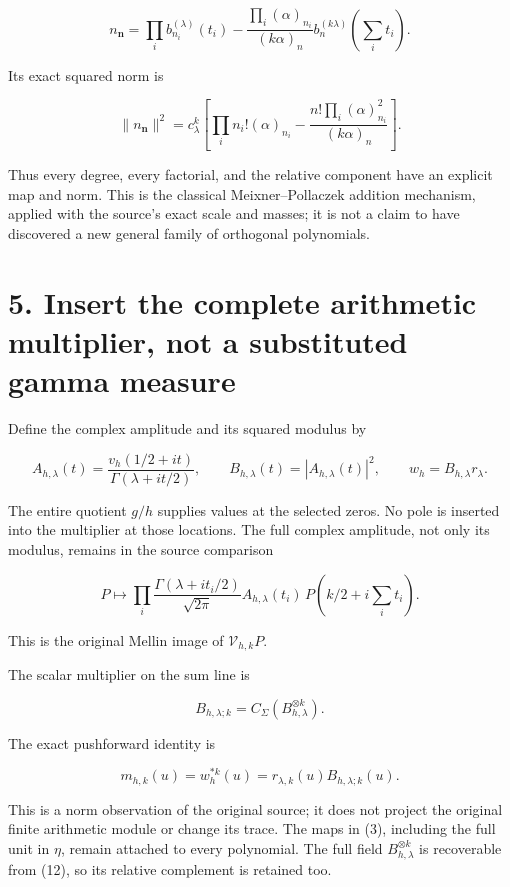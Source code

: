 \documentclass[
  11pt,
]{article}
\begin{document}
\[
n_{\mathbf n}=\prod_i b_{n_i}^{(\lambda)}(t_i)
 -\frac{\prod_i(\alpha)_{n_i}}{(k\alpha)_n}
                    b_n^{(k\lambda)}(\sum_i t_i).
\]

Its exact squared norm is

\[
\boxed{
\|n_{\mathbf n}\|^2
=c_\lambda^k\left[
\prod_i n_i!(\alpha)_{n_i}
 -\frac{n!\prod_i(\alpha)_{n_i}^2}{(k\alpha)_n}
\right].
}                                                                   \tag{16}
\]

Thus every degree, every factorial, and the relative component have an
explicit map and norm. This is the classical Meixner--Pollaczek addition
mechanism, applied with the source's exact scale and masses; it is not a
claim to have discovered a new general family of orthogonal polynomials.

\section{5. Insert the complete arithmetic multiplier, not a substituted
gamma
measure}\label{insert-the-complete-arithmetic-multiplier-not-a-substituted-gamma-measure}

Define the complex amplitude and its squared modulus by

\[
A_{h,\lambda}(t)
=\frac{v_h(1/2+it)}{\Gamma(\lambda+it/2)},\qquad
B_{h,\lambda}(t)=|A_{h,\lambda}(t)|^2,
\qquad w_h=B_{h,\lambda}r_\lambda.                                 \tag{17}
\]

The entire quotient \(g/h\) supplies values at the selected zeros. No
pole is inserted into the multiplier at those locations. The full
complex amplitude, not only its modulus, remains in the source
comparison

\[
P\longmapsto
\prod_i\frac{\Gamma(\lambda+it_i/2)}{\sqrt{2\pi}}
 A_{h,\lambda}(t_i)\,P(k/2+i\sum_i t_i).
                                                                    \tag{18}
\]

This is the original Mellin image of \(\mathcal V_{h,k}P\).

The scalar multiplier on the sum line is

\[
B_{h,\lambda;k}=C_\Sigma(B_{h,\lambda}^{\otimes k}).
\]

The exact pushforward identity is

\[
\boxed{
 m_{h,k}(u)=w_h^{*k}(u)=r_{\lambda,k}(u)B_{h,\lambda;k}(u).
}                                                                   \tag{19}
\]

This is a norm observation of the original source; it does not project
the original finite arithmetic module or change its trace. The maps in
(3), including the full unit in \(\eta\), remain attached to every
polynomial. The full field \(B_{h,\lambda}^{\otimes k}\) is recoverable
from (12), so its relative complement is retained too.
\end{document}
